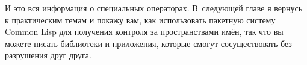И это вся информация о специальных операторах.  В~следующей главе я вернусь к
практическим темам и покажу вам, как использовать пакетную систему Common Lisp для
получения контроля за пространствами имён, так что вы можете писать библиотеки и
приложения, которые смогут сосуществовать без разрушения друг друга.

